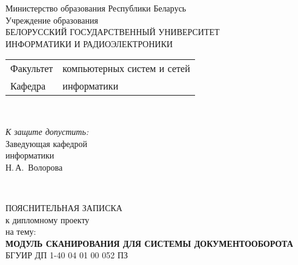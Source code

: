 \begin{titlepage}
  \begin{center}
    Министерство образования Республики Беларусь\\[1em]
    Учреждение образования\\
    БЕЛОРУССКИЙ ГОСУДАРСТВЕННЫЙ УНИВЕРСИТЕТ \\
    ИНФОРМАТИКИ И РАДИОЭЛЕКТРОНИКИ\\[1em]

    \begin{minipage}{\textwidth}
      \begin{flushleft}
        \begin{tabular}{ l l }
          Факультет & компьютерных систем и сетей\\
          Кафедра   & информатики
        \end{tabular}
      \end{flushleft}
    \end{minipage}\\[1em]

    \begin{flushright}
      \begin{minipage}{0.4\textwidth}
        \textit{К защите допустить:}\\[0.8em]
        Заведующая кафедрой \\ информатики\\[0.45em]
        \underline{\hspace*{2.8cm}} Н.\,А.~Волорова
      \end{minipage}\\[2.2em]
    \end{flushright}

    {ПОЯСНИТЕЛЬНАЯ ЗАПИСКА}\\
    {к дипломному проекту}\\
    {на тему:}\\[1em]
    \textbf{\large \MakeUppercase{
    МОДУЛЬ СКАНИРОВАНИЯ ДЛЯ СИСТЕМЫ ДОКУМЕНТООБОРОТА}}\\[1em]


    {БГУИР ДП 1-40 04 01 00 052 ПЗ}\\[2em]
    

\end{center}
\end{titlepage}
